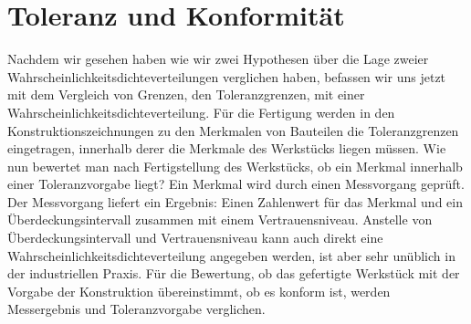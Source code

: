 \section{Toleranz und Konformität}

Nachdem wir gesehen haben wie wir zwei Hypothesen über die Lage zweier Wahrscheinlich\-keits\-dichte\-ver\-teilungen
verglichen haben, befassen wir uns jetzt mit dem Vergleich von Grenzen, den Toleranzgrenzen, mit einer
Wahrscheinlichkeitsdichteverteilung. Für die Fertigung werden in den Konstruktionszeichnungen zu den Merkmalen
von Bauteilen die Toleranzgrenzen eingetragen, innerhalb derer die Merkmale des Werkstücks liegen müssen. Wie nun
bewertet man nach Fertigstellung des Werkstücks, ob ein Merkmal innerhalb einer Toleranzvorgabe liegt? Ein Merkmal
wird durch einen Messvorgang geprüft. Der Messvorgang liefert ein Ergebnis: Einen Zahlenwert für das Merkmal und
ein Überdeckungsintervall zusammen mit einem Vertrauensniveau. Anstelle von Überdeckungsintervall und Vertrauensniveau
kann auch direkt eine Wahrscheinlichkeitsdichteverteilung angegeben werden, ist aber sehr unüblich in der industriellen
Praxis. Für die Bewertung, ob das gefertigte Werkstück mit der Vorgabe der Konstruktion übereinstimmt, ob es konform ist,
werden Messergebnis und Toleranzvorgabe verglichen.

